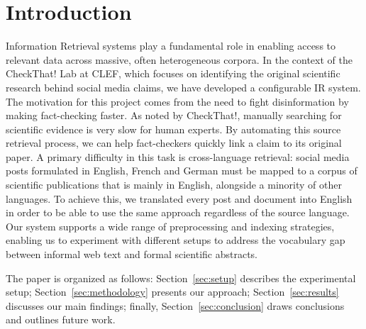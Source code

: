 \section{Introduction}
\label{sec:introduction}
Information Retrieval systems play a fundamental role in enabling access to relevant data across massive, often heterogeneous corpora. In the context of the CheckThat! Lab at CLEF, which focuses on identifying the original scientific research behind social media claims, we have developed a configurable IR system.
The motivation for this project comes from the need to fight disinformation by making fact-checking faster. As noted by CheckThat!, manually searching for scientific evidence is very slow for human experts. By automating this source retrieval process, we can help fact-checkers quickly link a claim to its original paper.
A primary difficulty in this task is cross-language retrieval: social media posts formulated in English, French and German must be mapped to a corpus of scientific publications that is mainly in English, alongside a minority of other languages.
To achieve this, we translated every post and document into English in order to be able to use the same approach regardless of the source language.
Our system supports a wide range of preprocessing and indexing strategies, enabling us to experiment with different setups to address the vocabulary gap between informal web text and formal scientific abstracts.

The paper is organized as follows: Section~\ref{sec:setup} describes the experimental setup; Section~\ref{sec:methodology} presents our approach; Section~\ref{sec:results} discusses our main findings; finally, Section~\ref{sec:conclusion} draws conclusions and outlines future work.